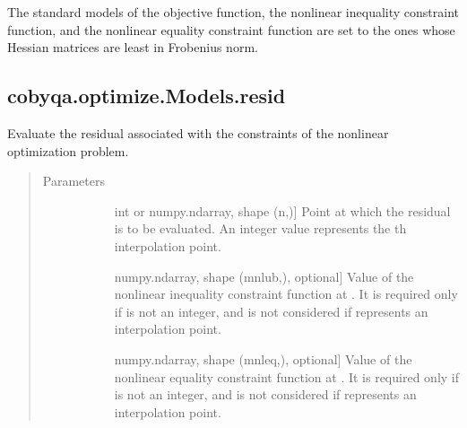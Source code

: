 \documentclass[letterpaper,10pt,english]{sphinxmanual}
\begin{document}
\begin{fulllineitems}
\begin{fulllineitems}
\sphinxAtStartPar
The standard models of the objective function, the nonlinear inequality
constraint function, and the nonlinear equality constraint function are
set to the ones whose Hessian matrices are least in Frobenius norm.

\end{fulllineitems}



\subsection{cobyqa.optimize.Models.resid}
\label{\detokenize{refs/generated/cobyqa.optimize.Models.resid:cobyqa-optimize-models-resid}}\label{\detokenize{refs/generated/cobyqa.optimize.Models.resid::doc}}

\begin{fulllineitems}
\label{\detokenize{refs/generated/cobyqa.optimize.Models.resid:cobyqa.optimize.Models.resid}}
\sphinxAtStartPar
Evaluate the residual associated with the constraints of the nonlinear
optimization problem.
\begin{quote}\begin{description}
\item[{Parameters}] \leavevmode\begin{description}
\item[{}] \leavevmode{[}int or numpy.ndarray, shape (n,){]}
\sphinxAtStartPar
Point at which the residual is to be evaluated. An integer value
represents the \sphinxhyphen{}th interpolation point.

\item[{}] \leavevmode{[}numpy.ndarray, shape (mnlub,), optional{]}
\sphinxAtStartPar
Value of the nonlinear inequality constraint function at . It
is required only if  is not an integer, and is not considered if
 represents an interpolation point.

\item[{}] \leavevmode{[}numpy.ndarray, shape (mnleq,), optional{]}
\sphinxAtStartPar
Value of the nonlinear equality constraint function at . It is
required only if  is not an integer, and is not considered if 
represents an interpolation point.


\end{description}
\end{description}
\end{quote}
\end{fulllineitems}
\end{fulllineitems}
\end{document}
